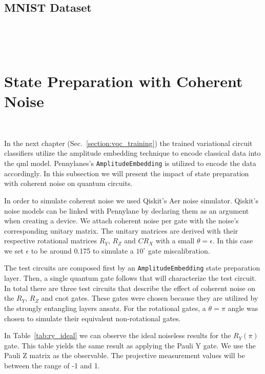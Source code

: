 ~\cite{wendlinger_comparative_2024}

\subsection{MNIST Dataset} \

~\cite{bottou_comparison_1994}

\section{State Preparation with Coherent Noise}\label{section:state_preparation_noise} \

In the next chapter (Sec.~\ref{section:vqc_training}) the trained variational circuit classifiers
utilize the amplitude embedding technique to encode classical data
into the \ac{qml} model. Pennylanes's \colorbox{inline_gray}{\lstinline|AmplitudeEmbedding|}
is utilized to encode the data accordingly. In this subsection we will
present the impact of state preparation with coherent noise on quantum
circuits. \

In order to simulate coherent noise we used Qiskit's Aer noise simulator.
Qiskit's noise models can be linked with Pennylane by declaring them as
an argument when creating a device. We attach coherent noise per gate
with the noise's corresponding unitary matrix. The unitary matrices are
derived with their respective rotational matrices \(R_{Y}\), \(R_{Z}\) and 
\(CR_{X}\) with a small \(\theta = \epsilon\). In this case we set 
\(\epsilon\) to be around 0.175 to simulate a \(10^{\circ}\) gate
miscalibration. \

The test circuits are composed first by an
\colorbox{inline_gray}{\lstinline|AmplitudeEmbedding|} state preparation
layer. Then, a single quantum gate follows that will characterize the
test circuit. In total there are three test circuits that describe the
effect of coherent noise on the \(R_{Y}\), \(R_{Z}\) and \ac{cnot} gates.
These gates were chosen because they are utilized by the strongly
entangling layers ansatz. For the rotational gates, a \(\theta = \pi\)
angle was chosen to simulate their equivalent non-rotational gates.\

In Table~\ref{tab:ry_ideal} we can observe the ideal noiseless results
for the \(R_{Y}(\pi)\) gate. This table yields the same result as applying
the Pauli Y gate. We use the Pauli Z matrix as the observable. The 
projective measurement values will be between the range of -1 and 1.

